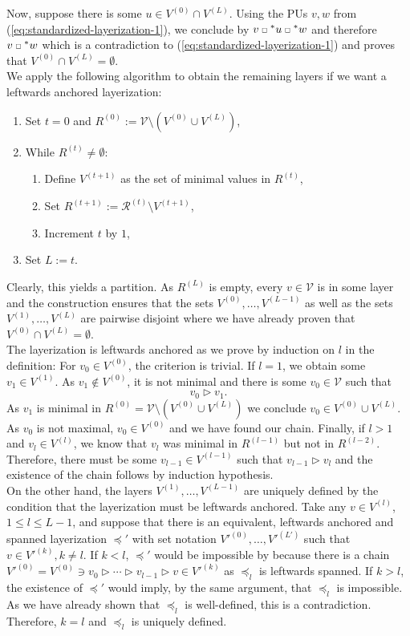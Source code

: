 \documentclass[a4paper,11pt]{report}
\newcommand{\smallsquare}{\;\scalebox{0.6}{$\square$}\;}
\begin{document}
\begin{Bew}
Now, suppose there is some $u\in V^{(0)}\cap V^{(L)}$. Using the PUs $v,w$ from (\ref{eq:standardized-layerization-1}), we conclude by  $v\smallsquare^* u\smallsquare^* w$ and therefore $v\smallsquare^* w$ which is a contradiction to (\ref{eq:standardized-layerization-1}) and proves that $V^{(0)}\cap V^{(L)}=\emptyset$.\\
We apply the following algorithm to obtain the remaining layers if we want a leftwards anchored layerization:
\begin{enumerate}
\item
Set $t=0$ and $R^{(0)}:=\mathcal{V}\setminus\left(V^{(0)}\cup V^{(L)}\right)$,
\item
While $R^{(t)}\ne\emptyset$:
\begin{enumerate}
\item
Define $V^{(t+1)}$ as the set of minimal values in $R^{(t)}$,
\item
Set $R^{(t+1)}:=\mathcal{R}^{(t)}\setminus V^{(t+1)}$,
\item
Increment $t$ by $1$,
\end{enumerate}
\item
Set $L:= t$.
\end{enumerate}
Clearly, this yields a partition. As $R^{(L)}$ is empty, every $v\in\mathcal{V}$ is in some layer and the construction ensures that the sets $V^{(0)},\dotsc,V^{(L-1)}$ as well as the sets $V^{(1)},\dotsc,V^{(L)}$ are pairwise disjoint where we have already proven that $V^{(0)}\cap V^{(L)}=\emptyset$.\\
The layerization is leftwards anchored as we prove by induction on $l$ in the definition: For $v_0\in V^{(0)}$, the criterion is trivial. If $l=1$, we obtain some $v_1\in V^{(1)}$. As $v_1\notin V^{(0)}$, it is not minimal and there is some $v_0\in\mathcal{V}$ such that
\[
v_0\triangleright v_1.
\]
As $v_1$ is minimal in $R^{(0)}=\mathcal{V}\setminus\left(V^{(0)}\cup V^{(L)}\right)$ we conclude $v_0\in V^{(0)}\cup V^{(L)}$. As $v_0$ is not maximal, $v_0\in V^{(0)}$ and we have found our chain.
Finally, if $l>1$ and $v_l\in V^{(l)}$, we know that $v_l$ was minimal in $R^{(l-1)}$ but not in $R^{(l-2)}$. Therefore, there must be some $v_{l-1}\in V^{(l-1)}$ such that $v_{l-1}\triangleright v_l$ and the existence of the chain follows by induction hypothesis.\\
On the other hand, the layers $V^{(1)},\dotsc,V^{(L-1)}$ are uniquely defined by the condition that the layerization must be leftwards anchored. Take any $v\in V^{(l)}$, $1\le l\le L-1$, and suppose that there is an equivalent, leftwards anchored and spanned layerization $\preceq'$ with set notation $V'^{(0)},\dotsc,V'^{(L')}$ such that $v\in V'^{(k)},k\ne l$. If $k<l$, $\preceq'$ would be impossible by  because there is a chain $V'^{(0)}=V^{(0)}\ni v_0\triangleright\dotsb\triangleright v_{l-1}\triangleright v\in V'^{(k)}$ as $\preceq_l$ is leftwards spanned. If $k>l$, the existence of $\preceq'$ would imply, by the same argument, that $\preceq_l$ is impossible. As we have already shown that $\preceq_l$ is well-defined, this is a contradiction. Therefore, $k=l$ and $\preceq_l$ is uniquely defined.\\

\end{Bew}
\end{document}
